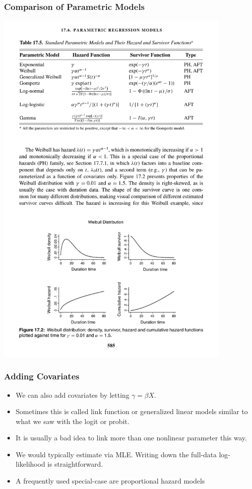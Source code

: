 \documentclass[xcolor=pdftex,dvipsnames,table,mathserif]{beamer}
\begin{document}
\begin{frame}
\frametitle{Comparison of Parametric Models}
\begin{center}
\includegraphics[width=4.5in]{./resources/figure17-5.pdf}
\end{center}
\end{frame}

\begin{frame}
\frametitle{Adding Covariates }
\begin{itemize}
\item We can also add covariates by letting $\gamma = \beta X$.
\item Sometimes this is called \alert{link function} or \alert{generalized linear models} similar to what we saw with the logit or probit.
\item It is usually a bad idea to link more than one nonlinear parameter this way.
\item We would typically estimate via MLE. Writing down the full-data log-likelihood is straightforward.
\item A frequently used special-case are \alert{proportional hazard models}
\end{itemize}
\end{frame}
\end{document}
